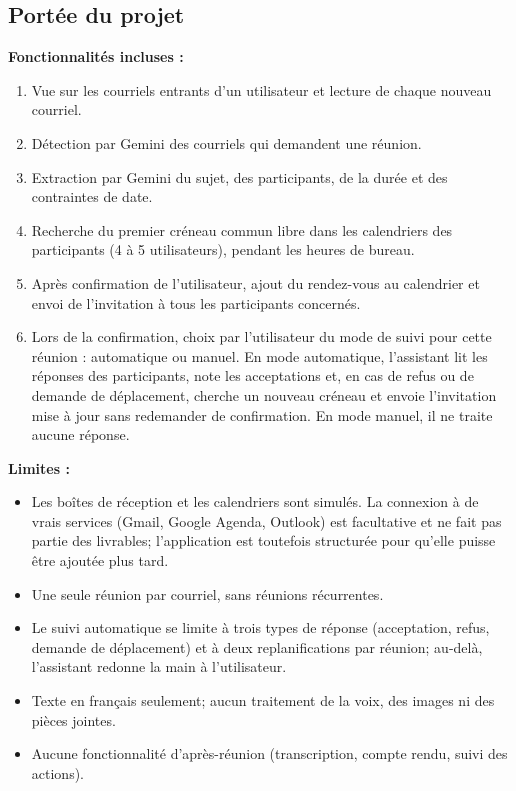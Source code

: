 \documentclass[11pt,letterpaper]{article}
\begin{document}
\subsection{Portée du projet}

\textbf{Fonctionnalités incluses :}
\begin{enumerate}
  \item Vue sur les courriels entrants d'un utilisateur et lecture de chaque nouveau courriel.
  \item Détection par Gemini des courriels qui demandent une réunion.
  \item Extraction par Gemini du sujet, des participants, de la durée et des contraintes de date.
  \item Recherche du premier créneau commun libre dans les calendriers des participants (4 à 5 utilisateurs), pendant les heures de bureau.
  \item Après confirmation de l'utilisateur, ajout du rendez-vous au calendrier et envoi de l'invitation à tous les participants concernés.
  \item Lors de la confirmation, choix par l'utilisateur du mode de suivi pour cette réunion : automatique ou manuel. En mode automatique, l'assistant lit les réponses des participants, note les acceptations et, en cas de refus ou de demande de déplacement, cherche un nouveau créneau et envoie l'invitation mise à jour sans redemander de confirmation. En mode manuel, il ne traite aucune réponse.
\end{enumerate}

\textbf{Limites :}
\begin{itemize}
  \item Les boîtes de réception et les calendriers sont simulés. La connexion à de vrais services (Gmail, Google Agenda, Outlook) est facultative et ne fait pas partie des livrables; l'application est toutefois structurée pour qu'elle puisse être ajoutée plus tard.
  \item Une seule réunion par courriel, sans réunions récurrentes.
  \item Le suivi automatique se limite à trois types de réponse (acceptation, refus, demande de déplacement) et à deux replanifications par réunion; au-delà, l'assistant redonne la main à l'utilisateur.
  \item Texte en français seulement; aucun traitement de la voix, des images ni des pièces jointes.
  \item Aucune fonctionnalité d'après-réunion (transcription, compte rendu, suivi des actions).
\end{itemize}
\end{document}
